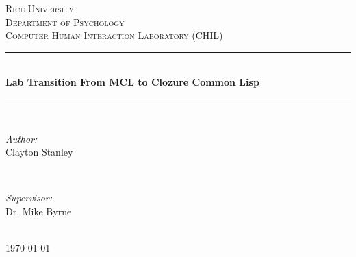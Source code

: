 \documentclass[12pt]{article} %
\begin{document}

\begin{titlepage}

\newcommand{\HRule}{\rule{\linewidth}{0.5mm}} %

\center %

\textsc{\LARGE Rice University}\\[1.5cm] %
\textsc{\Large Department of Psychology}\\[0.5cm] %
\textsc{\large Computer Human Interaction Laboratory (CHIL)}\\[0.5cm] %


\HRule \\[0.4cm]
{ \huge \bfseries Lab Transition From MCL to Clozure Common Lisp}\\[0.4cm] %
\HRule \\[1.5cm]

\begin{minipage}{0.4\textwidth}
\begin{flushleft} \large
\emph{Author:}\\
Clayton Stanley %
\end{flushleft}
\end{minipage}
~
\begin{minipage}{0.4\textwidth}
\begin{flushright} \large
\emph{Supervisor:} \\
Dr. Mike Byrne %
\end{flushright}
\end{minipage}\\[4cm]

{\large \today}\\[3cm] %


\vfill %

\end{titlepage}
\end{document}
